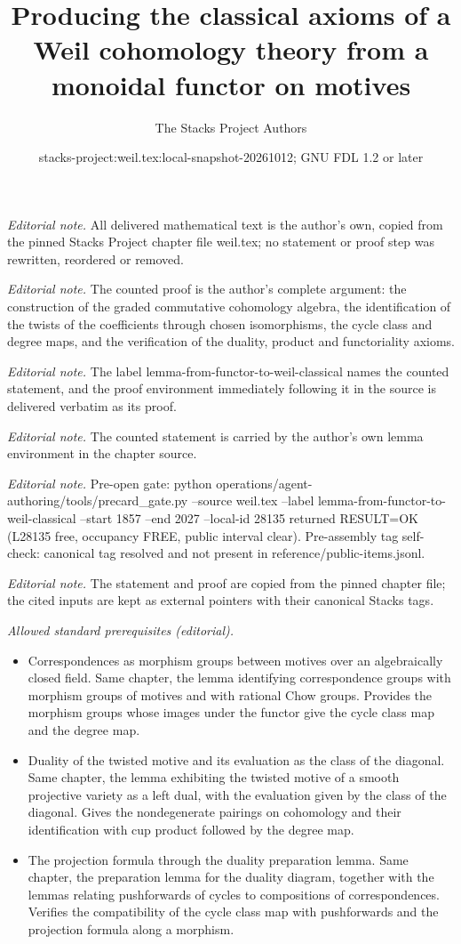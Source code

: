 \documentclass[10pt,a4paper]{amsart}
\title{Producing the classical axioms of a Weil cohomology theory from a monoidal functor on motives}
\author{The Stacks Project Authors}
\date{stacks-project:weil.tex:local-snapshot-20261012; GNU FDL 1.2 or later}
\theoremstyle{plain}
\theoremstyle{definition}
\theoremstyle{remark}
\numberwithin{equation}{subsection}
\begin{document}
\maketitle
\noindent\textit{Editorial note.} All delivered mathematical text is the author's own, copied from the pinned Stacks Project chapter file weil.tex; no statement or proof step was rewritten, reordered or removed.\par\medskip
\noindent\textit{Editorial note.} The counted proof is the author's complete argument: the construction of the graded commutative cohomology algebra, the identification of the twists of the coefficients through chosen isomorphisms, the cycle class and degree maps, and the verification of the duality, product and functoriality axioms.\par\medskip
\noindent\textit{Editorial note.} The label lemma-from-functor-to-weil-classical names the counted statement, and the proof environment immediately following it in the source is delivered verbatim as its proof.\par\medskip
\noindent\textit{Editorial note.} The counted statement is carried by the author's own lemma environment in the chapter source.\par\medskip
\noindent\textit{Editorial note.} Pre-open gate: python operations/agent-authoring/tools/precard\_gate.py --source weil.tex --label lemma-from-functor-to-weil-classical --start 1857 --end 2027 --local-id 28135 returned RESULT=OK (L28135 free, occupancy FREE, public interval clear). Pre-assembly tag self-check: canonical tag resolved and not present in reference/public-items.jsonl.\par\medskip
\noindent\textit{Editorial note.} The statement and proof are copied from the pinned chapter file; the cited inputs are kept as external pointers with their canonical Stacks tags.\par\medskip
\noindent\textit{Allowed standard prerequisites (editorial).}\begin{itemize}
\item Correspondences as morphism groups between motives over an algebraically closed field. Same chapter, the lemma identifying correspondence groups with morphism groups of motives and with rational Chow groups. Provides the morphism groups whose images under the functor give the cycle class map and the degree map.
\item Duality of the twisted motive and its evaluation as the class of the diagonal. Same chapter, the lemma exhibiting the twisted motive of a smooth projective variety as a left dual, with the evaluation given by the class of the diagonal. Gives the nondegenerate pairings on cohomology and their identification with cup product followed by the degree map.
\item The projection formula through the duality preparation lemma. Same chapter, the preparation lemma for the duality diagram, together with the lemmas relating pushforwards of cycles to compositions of correspondences. Verifies the compatibility of the cycle class map with pushforwards and the projection formula along a morphism.
\end{itemize}\medskip
\end{document}
